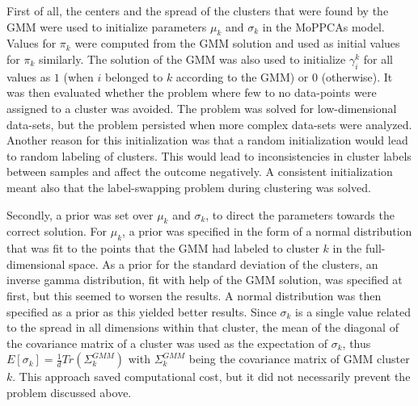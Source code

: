 First of all, the centers and the spread of the clusters that were found by the GMM were used to initialize parameters $\mu_k$ and $\sigma_k$ in the MoPPCAs model. Values for $\pi_k$ were computed from the GMM solution and used as initial values for $\pi_k$ similarly. The solution of the GMM was also used to initialize $\gamma^k_i$ for all values as  $1$ (when $i$ belonged to $k$ according to the GMM) or $0$ (otherwise). It was then evaluated whether the problem where few to no data-points were assigned to a cluster was avoided. The problem was solved for low-dimensional data-sets, but the problem persisted when more complex data-sets were analyzed. Another reason for this initialization was that a random initialization would lead to random labeling of clusters. This would lead to inconsistencies in cluster labels between samples and affect the outcome negatively. A consistent initialization meant also that the label-swapping problem during clustering was solved.

Secondly, a prior was set over $\mu_k$ and $\sigma_k$, to direct the parameters towards the correct solution. For $\mu_k$, a prior was specified in the form of a normal distribution that was fit to the points that the GMM had labeled to cluster $k$ in the full-dimensional space. As a prior for the standard deviation of the clusters, an inverse gamma distribution, fit with help of the GMM solution, was specified at first, but this seemed to worsen the results. A normal distribution was then specified as a prior as this yielded better results. Since $\sigma_k$ is a single value related to the spread in all dimensions within that cluster, the mean of the diagonal of the covariance matrix of a cluster was used as the expectation of $\sigma_k$, thus $E[\sigma_k] = \frac{1}{d}Tr(\Sigma^{GMM}_k)$ with $\Sigma^{GMM}_k$ being the covariance matrix of GMM cluster $k$.
This approach saved computational cost, but it did not necessarily prevent the problem discussed above.

